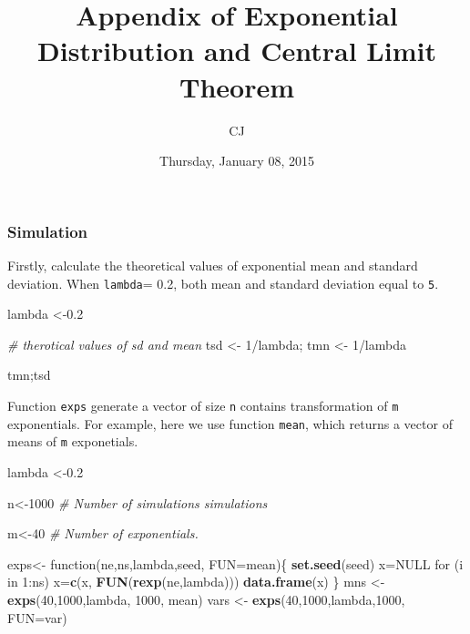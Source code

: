 \documentclass[]{article}
\title{Appendix of Exponential Distribution and Central Limit Theorem}
\author{CJ}
\date{Thursday, January 08, 2015}
\newenvironment{Shaded}{\begin{snugshade}}{\end{snugshade}}
\newcommand{\KeywordTok}[1]{\textcolor[rgb]{0.13,0.29,0.53}{\textbf{{#1}}}}
\newcommand{\DataTypeTok}[1]{\textcolor[rgb]{0.13,0.29,0.53}{{#1}}}
\newcommand{\DecValTok}[1]{\textcolor[rgb]{0.00,0.00,0.81}{{#1}}}
\newcommand{\FloatTok}[1]{\textcolor[rgb]{0.00,0.00,0.81}{{#1}}}
\newcommand{\StringTok}[1]{\textcolor[rgb]{0.31,0.60,0.02}{{#1}}}
\newcommand{\CommentTok}[1]{\textcolor[rgb]{0.56,0.35,0.01}{\textit{{#1}}}}
\newcommand{\OtherTok}[1]{\textcolor[rgb]{0.56,0.35,0.01}{{#1}}}
\newcommand{\NormalTok}[1]{{#1}}
\begin{document}
\maketitle


{
\hypersetup{linkcolor=black}
\setcounter{tocdepth}{2}
\tableofcontents
}
\subsubsection{Simulation}\label{simulation}

Firstly, calculate the theoretical values of exponential mean and
standard deviation. When \texttt{lambda}= 0.2, both mean and standard
deviation equal to \texttt{5}.

\begin{Shaded}
\begin{Highlighting}[]
\NormalTok{lambda <-}\FloatTok{0.2} 

\CommentTok{# therotical values of sd and mean}
\NormalTok{tsd <-}\StringTok{ }\DecValTok{1}\NormalTok{/lambda; tmn <-}\StringTok{ }\DecValTok{1}\NormalTok{/lambda}

\NormalTok{tmn;tsd}
\end{Highlighting}
\end{Shaded}

Function \texttt{exps} generate a vector of size \texttt{n} contains
transformation of \texttt{m} exponentials. For example, here we use
function \texttt{mean}, which returns a vector of means of \texttt{m}
exponetials.

\begin{Shaded}
\begin{Highlighting}[]
\NormalTok{lambda <-}\FloatTok{0.2}

\NormalTok{n<-}\DecValTok{1000} \CommentTok{# Number of simulations simulations}

\NormalTok{m<-}\DecValTok{40} \CommentTok{# Number of  exponentials.}

\NormalTok{exps<-}\StringTok{ }\NormalTok{function(ne,ns,lambda,seed, }\DataTypeTok{FUN=}\NormalTok{mean)\{        }
        \KeywordTok{set.seed}\NormalTok{(seed)}
        \NormalTok{x=}\OtherTok{NULL}
        \NormalTok{for (i in }\DecValTok{1}\NormalTok{:ns) x=}\KeywordTok{c}\NormalTok{(x, }\KeywordTok{FUN}\NormalTok{(}\KeywordTok{rexp}\NormalTok{(ne,lambda))) }
        \KeywordTok{data.frame}\NormalTok{(x)       }
\NormalTok{\} }
\NormalTok{mns <-}\StringTok{ }\KeywordTok{exps}\NormalTok{(}\DecValTok{40}\NormalTok{,}\DecValTok{1000}\NormalTok{,lambda, }\DecValTok{1000}\NormalTok{, mean)}
\NormalTok{vars <-}\StringTok{ }\KeywordTok{exps}\NormalTok{(}\DecValTok{40}\NormalTok{,}\DecValTok{1000}\NormalTok{,lambda,}\DecValTok{1000}\NormalTok{, }\DataTypeTok{FUN=}\NormalTok{var)}
\end{Highlighting}
\end{Shaded}
\end{document}
